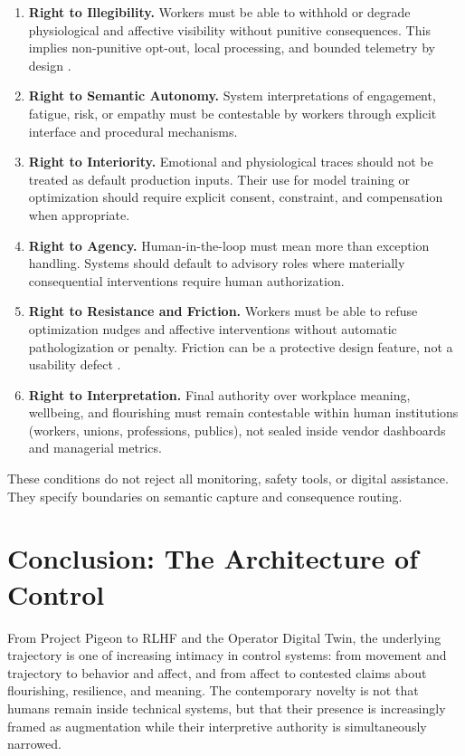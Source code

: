 \documentclass[11pt, a4paper]{article}
\begin{document}
\begin{enumerate}[leftmargin=1.5em]
    \item \textbf{Right to Illegibility.} Workers must be able to withhold or degrade physiological and affective visibility without punitive consequences. This implies non-punitive opt-out, local processing, and bounded telemetry by design \cite{nissenbaum2015obfuscation}.

    \item \textbf{Right to Semantic Autonomy.} System interpretations of engagement, fatigue, risk, or empathy must be contestable by workers through explicit interface and procedural mechanisms.

    \item \textbf{Right to Interiority.} Emotional and physiological traces should not be treated as default production inputs. Their use for model training or optimization should require explicit consent, constraint, and compensation when appropriate.

    \item \textbf{Right to Agency.} Human-in-the-loop must mean more than exception handling. Systems should default to advisory roles where materially consequential interventions require human authorization.

    \item \textbf{Right to Resistance and Friction.} Workers must be able to refuse optimization nudges and affective interventions without automatic pathologization or penalty. Friction can be a protective design feature, not a usability defect \cite{disalvo2012adversarial}.

    \item \textbf{Right to Interpretation.} Final authority over workplace meaning, wellbeing, and flourishing must remain contestable within human institutions (workers, unions, professions, publics), not sealed inside vendor dashboards and managerial metrics.
\end{enumerate}

These conditions do not reject all monitoring, safety tools, or digital assistance. They specify boundaries on semantic capture and consequence routing.

\section{Conclusion: The Architecture of Control}

From Project Pigeon to RLHF and the Operator Digital Twin, the underlying trajectory is one of increasing intimacy in control systems: from movement and trajectory to behavior and affect, and from affect to contested claims about flourishing, resilience, and meaning. The contemporary novelty is not that humans remain inside technical systems, but that their presence is increasingly framed as augmentation while their interpretive authority is simultaneously narrowed.
\end{document}
